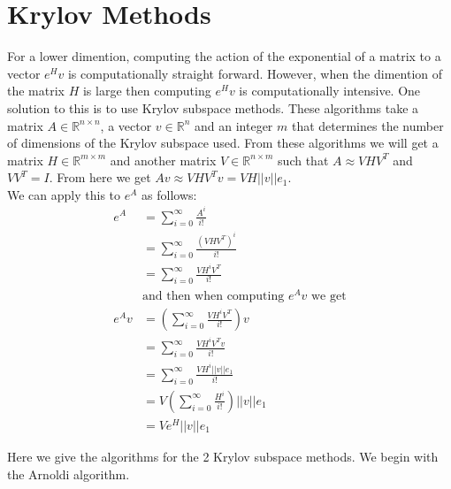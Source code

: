 \section{Krylov Methods}

For a lower dimention, computing the action of the exponential of a matrix to a vector $e^{H}v$ is computationally straight forward.
However, when the dimention of the matrix $H$ is large then computing $e^{H}v$ is computationally intensive.
One solution to this is to use Krylov subspace methods.
These algorithms take a matrix $A\in \mathbb{R}^{n\times n}$, a vector $v \in \mathbb{R}^n$ and an integer $m$ that determines the number of dimensions of the Krylov subspace used.
From these algorithms we will get a matrix $H \in \mathbb{R}^{m\times m}$ and another matrix $V \in \mathbb{R}^{n\times m}$ such that $A \approx VHV^T$ and $VV^T = I$.
From here we get $Av \approx VHV^Tv = VH||v||e_1$.\\
We can apply this to $e^A$ as follows:
\begin{align*}
e^A &= \sum^{\infty}_{i=0}\frac{A^i}{i!}\\
&= \sum^{\infty}_{i=0}\frac{(VHV^T)^i}{i!} \\
&= \sum^{\infty}_{i=0}\frac{VH^iV^T}{i!} \\
&\text {and then when computing $e^Av$ we get}\\
e^Av &= (\sum^{\infty}_{i=0}\frac{VH^iV^T}{i!})v \\
&= \sum^{\infty}_{i=0}\frac{VH^iV^Tv}{i!} \\
&= \sum^{\infty}_{i=0}\frac{VH^i||v||e_1}{i!} \\
&= V(\sum^{\infty}_{i=0}\frac{H^i}{i!})||v||e_1 \\
&= Ve^H||v||e_1
\end{align*}

Here we give the algorithms for the 2 Krylov subspace methods.
We begin with the Arnoldi algorithm.


